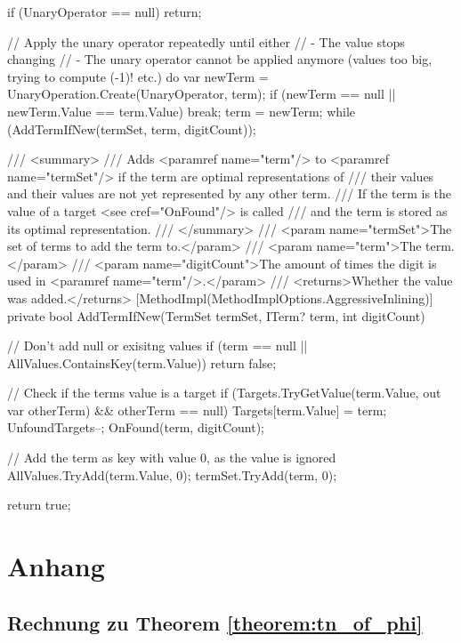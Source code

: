 \documentclass{article}
\theoremstyle{nonumberplain}
\begin{document}
\begin{lstcs}[]
{{        if (UnaryOperator == null) return;

        // Apply the unary operator repeatedly until either
        //  - The value stops changing
        //  - The unary operator cannot be applied anymore (values too big, trying to compute (-1)! etc.)
        do
        {
            var newTerm = UnaryOperation.Create(UnaryOperator, term);
            if (newTerm == null || newTerm.Value == term.Value) break;
            term = newTerm;
        }
        while (AddTermIfNew(termSet, term, digitCount));
    }

    /// <summary>
    /// Adds <paramref name="term"/> to <paramref name="termSet"/> if the term are optimal representations of
    /// their values and their values are not yet represented by any other term.
    /// If the term is the value of a target <see cref="OnFound"/> is called
    /// and the term is stored as its optimal representation.
    /// </summary>
    /// <param name="termSet">The set of terms to add the term to.</param>
    /// <param name="term">The term.</param>
    /// <param name="digitCount">The amount of times the digit is used in <paramref name="term"/>.</param>
    /// <returns>Whether the value was added.</returns>
    [MethodImpl(MethodImplOptions.AggressiveInlining)]
    private bool AddTermIfNew(TermSet termSet, ITerm? term, int digitCount)
    {
        // Don't add null or exisitng values
        if (term == null || AllValues.ContainsKey(term.Value))
        {
            return false;
        }

        // Check if the terms value is a target
        if (Targets.TryGetValue(term.Value, out var otherTerm) && otherTerm == null)
        {
            Targets[term.Value] = term;
            UnfoundTargets--;
            OnFound(term, digitCount);
        }

        // Add the term as key with value 0, as the value is ignored
        AllValues.TryAdd(term.Value, 0);
        termSet.TryAdd(term, 0);

        return true;
    }
}
\end{lstcs}

\section{Anhang}

\subsection{Rechnung zu Theorem \ref{theorem:tn_of_phi}}
\end{document}
